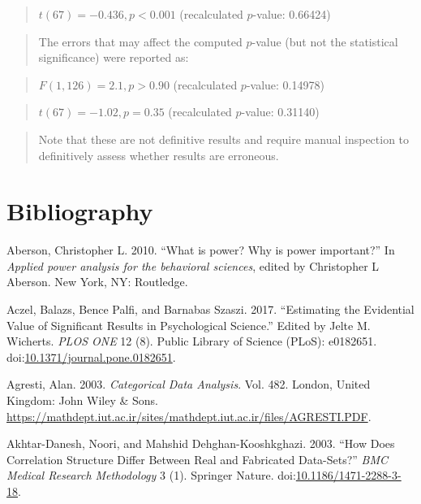 \documentclass[a5paper]{book}
\begin{document}
\begin{quote}
\(t(67)=-0.436, p<0.001\) (recalculated \(p\)-value: 0.66424)
\end{quote}

\begin{quote}
The errors that may affect the computed \(p\)-value (but not the
statistical significance) were reported as:
\end{quote}

\begin{quote}
\(F(1,126)=2.1, p>0.90\) (recalculated \(p\)-value: 0.14978)
\end{quote}

\begin{quote}
\(t(67)=-1.02, p=0.35\) (recalculated \(p\)-value: 0.31140)
\end{quote}

\begin{quote}
Note that these are not definitive results and require manual inspection
to definitively assess whether results are erroneous.
\end{quote}

\chapter*{Bibliography}\label{bibliography}

\hypertarget{refs}{}
\hypertarget{ref-Aberson2010-xa}{}
Aberson, Christopher L. 2010. ``What is power? Why is power important?''
In \emph{Applied power analysis for the behavioral sciences}, edited by
Christopher L Aberson. New York, NY: Routledge.

\hypertarget{ref-doi:10.1371ux2fjournal.pone.0182651}{}
Aczel, Balazs, Bence Palfi, and Barnabas Szaszi. 2017. ``Estimating the
Evidential Value of Significant Results in Psychological Science.''
Edited by Jelte M. Wicherts. \emph{PLOS ONE} 12 (8). Public Library of
Science (PLoS): e0182651.
doi:\href{https://doi.org/10.1371/journal.pone.0182651}{10.1371/journal.pone.0182651}.

\hypertarget{ref-isbn:0471360937}{}
Agresti, Alan. 2003. \emph{Categorical Data Analysis}. Vol. 482. London,
United Kingdom: John Wiley \& Sons.
\url{https://mathdept.iut.ac.ir/sites/mathdept.iut.ac.ir/files/AGRESTI.PDF}.

\hypertarget{ref-doi:10.1186ux2f1471-2288-3-18}{}
Akhtar-Danesh, Noori, and Mahshid Dehghan-Kooshkghazi. 2003. ``How Does
Correlation Structure Differ Between Real and Fabricated Data-Sets?''
\emph{BMC Medical Research Methodology} 3 (1). Springer Nature.
doi:\href{https://doi.org/10.1186/1471-2288-3-18}{10.1186/1471-2288-3-18}.
\end{document}
